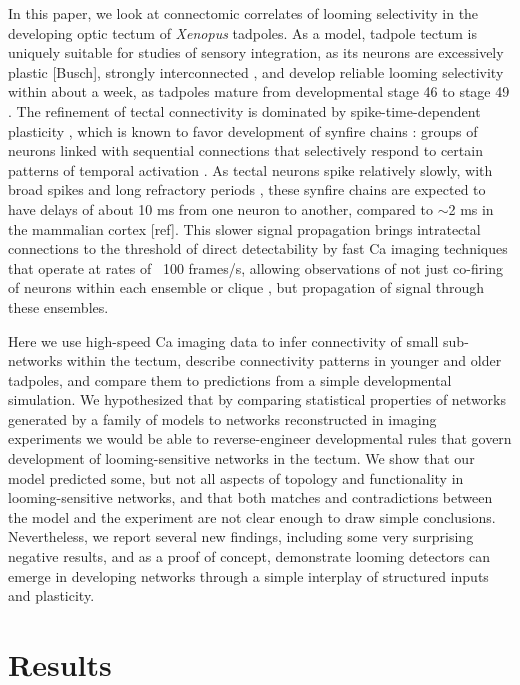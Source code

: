 \documentclass{article}
\begin{document}
In this paper, we look at connectomic correlates of looming selectivity in the developing optic tectum of \textit{Xenopus} tadpoles. As a model, tadpole tectum is uniquely suitable for studies of sensory integration, as its neurons are excessively plastic \citep{pratt2007intrinsic}[Busch], strongly interconnected \citep{james2015}, and develop reliable looming selectivity within about a week, as tadpoles mature from developmental stage 46 to stage 49 \citep{dong2009,khakhalin2014}. The refinement of tectal connectivity is dominated by spike-time-dependent plasticity \citep{zhang1998stdp,mu2006stdp}, which is known to favor development of synfire chains \citep{fiete2010chains,zheng2014synfire}: groups of neurons linked with sequential connections that selectively respond to certain patterns of temporal activation \citep{clopath2010stdpcoding}. As  tectal neurons spike relatively slowly, with broad spikes and long refractory periods \citep{ciarleglio2015,jang2016}, these synfire chains are expected to have delays of about 10 ms from one neuron to another, compared to $\sim$2 ms in the mammalian cortex [ref]. This slower signal propagation brings intratectal connections to the threshold of direct detectability by fast Ca imaging techniques that operate at rates of ~100 frames/s, allowing observations of not just co-firing of neurons within each ensemble or clique \citep{reimann2017,avitan2017spontaneous}, but propagation of signal through these ensembles.

Here we use high-speed Ca imaging data to infer connectivity of small sub-networks within the tectum, describe connectivity patterns in younger and older tadpoles, and compare them to predictions from a simple developmental simulation. We hypothesized that by comparing statistical properties of networks generated by a family of models to networks reconstructed in imaging experiments we would be able to reverse-engineer developmental rules that govern development of looming-sensitive networks in the tectum. We show that our model predicted some, but not all aspects of topology and functionality in looming-sensitive networks, and that both matches and contradictions between the model and the experiment are not clear enough to draw simple conclusions. Nevertheless, we report several new findings, including some very surprising negative results, and as a proof of concept, demonstrate looming detectors can emerge in developing networks through a simple interplay of structured inputs and plasticity.

\section*{Results}
\end{document}
